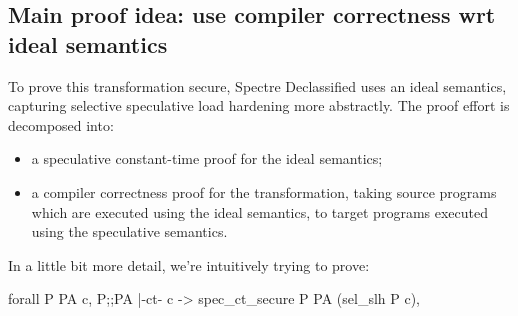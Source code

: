 \documentclass[12pt]{report}
\begin{document}
\subsection{Main proof idea: use compiler correctness wrt ideal semantics}



 To prove this transformation secure, Spectre Declassified uses an ideal
    semantics, capturing selective speculative load hardening more abstractly.
    The proof effort is decomposed into:

\begin{itemize}
\item  a speculative constant-time proof for the ideal semantics;

\item  a compiler correctness proof for the  transformation, taking source
      programs which are executed using the ideal semantics, to target programs
      executed using the speculative semantics.

\end{itemize}
 

 In a little bit more detail, we're intuitively trying to prove:


forall P PA c, P;;PA |-ct- c -> spec\_ct\_secure P PA (sel\_slh P c),
\end{document}
